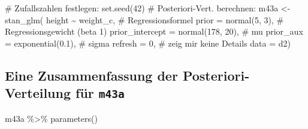 \documentclass[
  a4paper,
  DIV=11]{scrreprt}
\newenvironment{Shaded}{\begin{snugshade}}{\end{snugshade}}
\newcommand{\AttributeTok}[1]{\textcolor[rgb]{0.40,0.45,0.13}{#1}}
\newcommand{\CommentTok}[1]{\textcolor[rgb]{0.37,0.37,0.37}{#1}}
\newcommand{\DecValTok}[1]{\textcolor[rgb]{0.68,0.00,0.00}{#1}}
\newcommand{\FloatTok}[1]{\textcolor[rgb]{0.68,0.00,0.00}{#1}}
\newcommand{\FunctionTok}[1]{\textcolor[rgb]{0.28,0.35,0.67}{#1}}
\newcommand{\NormalTok}[1]{\textcolor[rgb]{0.00,0.23,0.31}{#1}}
\newcommand{\OtherTok}[1]{\textcolor[rgb]{0.00,0.23,0.31}{#1}}
\newcommand{\SpecialCharTok}[1]{\textcolor[rgb]{0.37,0.37,0.37}{#1}}
\theoremstyle{definition}
\theoremstyle{remark}
\begin{document}
\begin{Shaded}
\begin{Highlighting}[]
\CommentTok{\# Zufallszahlen festlegen:}
\FunctionTok{set.seed}\NormalTok{(}\DecValTok{42}\NormalTok{)  }
\CommentTok{\# Posteriori{-}Vert. berechnen:}
\NormalTok{m43a }\OtherTok{\textless{}{-}}
  \FunctionTok{stan\_glm}\NormalTok{(}
\NormalTok{    height }\SpecialCharTok{\textasciitilde{}}\NormalTok{ weight\_c,  }\CommentTok{\# Regressionsformel}
    \AttributeTok{prior =} \FunctionTok{normal}\NormalTok{(}\DecValTok{5}\NormalTok{, }\DecValTok{3}\NormalTok{),  }\CommentTok{\# Regressionsgewicht (beta 1)}
    \AttributeTok{prior\_intercept =} \FunctionTok{normal}\NormalTok{(}\DecValTok{178}\NormalTok{, }\DecValTok{20}\NormalTok{),  }\CommentTok{\# mu}
    \AttributeTok{prior\_aux =} \FunctionTok{exponential}\NormalTok{(}\FloatTok{0.1}\NormalTok{),  }\CommentTok{\# sigma}
    \AttributeTok{refresh =} \DecValTok{0}\NormalTok{,  }\CommentTok{\# zeig mir keine Details}
    \AttributeTok{data =}\NormalTok{ d2)}
\end{Highlighting}
\end{Shaded}

\hypertarget{eine-zusammenfassung-der-posteriori-verteilung-fuxfcr-m43a}{%
\subsection{\texorpdfstring{Eine Zusammenfassung der
Posteriori-Verteilung für
\texttt{m43a}}{Eine Zusammenfassung der Posteriori-Verteilung für m43a}}\label{eine-zusammenfassung-der-posteriori-verteilung-fuxfcr-m43a}}

\begin{Shaded}
\begin{Highlighting}[]
\NormalTok{m43a }\SpecialCharTok{\%\textgreater{}\%} 
  \FunctionTok{parameters}\NormalTok{()}
\end{Highlighting}
\end{Shaded}
\end{document}
